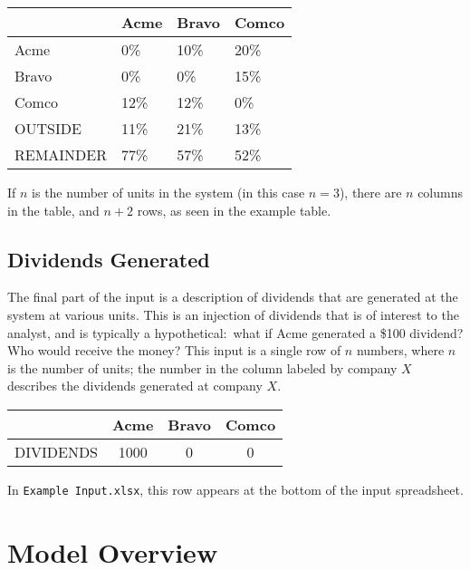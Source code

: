 \documentclass[a4paper,12pt,reqno]{amsart}
\theoremstyle{definition} \newtheorem{example}{Example}
\theoremstyle{definition} \newtheorem{condition}{Condition}
\theoremstyle{definition} \newtheorem{corollary}{Corollary}
\theoremstyle{definition} \newtheorem{claim}{Claim}
\theoremstyle{definition} \newtheorem{definition}{Definition}
\theoremstyle{definition} \newtheorem{conjecture}{Conjecture}
\theoremstyle{definition} \newtheorem{lemma}{Lemma}
\theoremstyle{definition} \newtheorem{theorem}{Theorem}
\theoremstyle{definition} \newtheorem*{theoremNoNumber}{Theorem}
\theoremstyle{definition} \newtheorem*{lemmaCorrespondence}{Lemma \ref{lem:correspondence}}
\theoremstyle{definition}\newtheorem{proposition}{Proposition}
\theoremstyle{definition} \newtheorem{result}{Result}
\theoremstyle{definition} \newtheorem*{definitionNoNumber}{Definition}
\theoremstyle{definition} \newtheorem{assumption}{Assumption}
\theoremstyle{definition} \newtheorem*{assumptionNoNumber}{Assumption}
\theoremstyle{definition} \newtheorem*{fact}{Fact}
\theoremstyle{definition} \newtheorem*{property}{Property}
\theoremstyle{definition} \newtheorem{remark}{Remark}
\begin{document}

\begin{center}
\begin{tabular}{llll}
\toprule
 & Acme & Bravo & Comco \\
\midrule
Acme & 0\% & 10\% & 20\% \\
Bravo & 0\% & 0\% & 15\% \\
Comco & 12\% & 12\% & 0\% \\
\midrule
\midrule
\uppercase{Outside} & 11\% & 21\% & 13\% \\
\uppercase{Remainder} & 77\% & 57\% & 52\% \\
\bottomrule
\end{tabular}

\end{center}


If $n$ is the number of units in the system (in this case $n=3$), there are $n$ columns in the table,  and $n+2$ rows, as seen in the example table.
\subsection{Dividends Generated}  \label{sec:dividends-input}
 The final part of the input is a description of dividends that are generated at the system at various units. This is an injection of dividends that is of interest to the analyst, and is typically a hypothetical:\ what if Acme generated a \$100 dividend? Who would receive the money? This input is a single row of $n$ numbers, where $n$ is the number of units; the number in the column labeled by company $X$ describes the dividends generated at company $X$. 
\begin{center}
\begin{tabular}{lccc}
\toprule
 & Acme & Bravo & Comco  \\
\midrule
DIVIDENDS & 1000 & 0 & 0\\


\bottomrule
\end{tabular}
\end{center}
In {\tt Example Input.xlsx}, this row appears at the bottom of the input spreadsheet.

\section{Model Overview}
\end{document}
